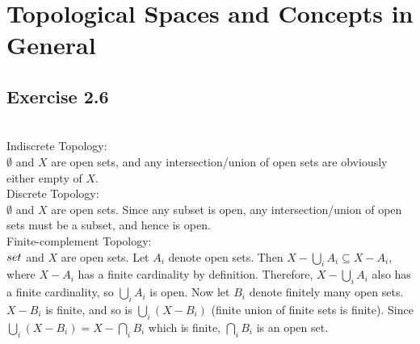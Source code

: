 \newpage

\section{Topological Spaces and Concepts in General}

\subsection{Exercise 2.6}


\begin{solution}
 \\Indiscrete Topology: \\
 $\emptyset$ and $X$ are open sets, and any intersection/union of open sets are obviously either empty of $X$. \\
 Discrete Topology: \\
 $\emptyset$ and $X$ are open sets. Since any subset is open, any intersection/union of open sets must be a subset, and hence is open. \\
 Finite-complement Topology: \\
 $\empty set$ and $X$ are open sets. Let $A_i$ denote open sets. Then $X - \bigcup_i A_i \subseteq X - A_i$, where $X - A_i$ has a finite cardinality by definition. Therefore, $X - \bigcup_i A_i$ also has a finite cardinality, so $\bigcup_i A_i$ is open. Now let $B_i$ denote finitely many open sets. $X-B_i$ is finite, and so is $\bigcup_i (X - B_i)$ (finite union of finite sets is finite). Since $\bigcup_i (X - B_i) = X - \bigcap_i B_i$ which is finite, $\bigcap_i B_i$ is an open set.
\end{solution}

\question


